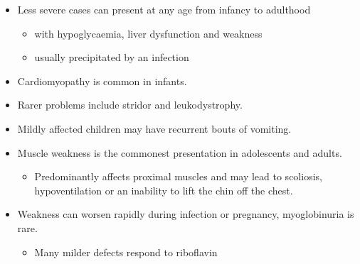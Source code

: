\documentclass{scrartcl}
\begin{document}
\begin{enumerate}
\begin{itemize}
\item Less severe cases can present at any age from infancy to adulthood
\begin{itemize}
\item with hypoglycaemia, liver dysfunction and weakness
\item usually precipitated by an infection
\end{itemize}
\item Cardiomyopathy is common in infants.
\item Rarer problems include stridor and leukodystrophy.
\item Mildly affected children may have recurrent bouts of vomiting.
\item Muscle weakness is the commonest presentation in adolescents and adults.
\begin{itemize}
\item Predominantly affects proximal muscles and may lead to scoliosis,
hypoventilation or an inability to lift the chin off the chest.
\end{itemize}
\item Weakness can worsen rapidly during infection or pregnancy, myoglobinuria is rare.
\begin{itemize}
\item Many milder defects respond to riboflavin
\end{itemize}
\end{itemize}
\end{enumerate}
\end{document}
